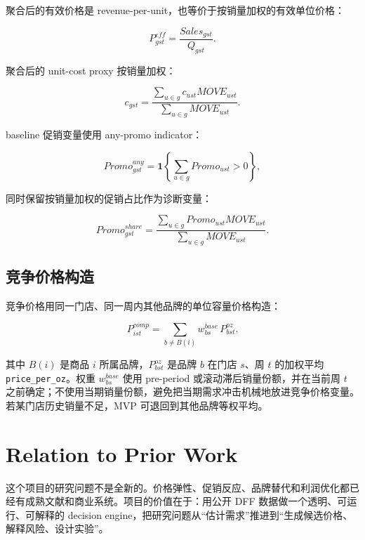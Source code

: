 \documentclass[UTF8,11pt,a4paper,fontset=none]{ctexart}
\begin{document}
聚合后的有效价格是 revenue-per-unit，也等价于按销量加权的有效单位价格：

\begin{equation}
P^{eff}_{gst}=\frac{Sales_{gst}}{Q_{gst}}.
\end{equation}

聚合后的 unit-cost proxy 按销量加权：

\begin{equation}
c_{gst}=
\frac{\sum_{u\in g} c_{ust} MOVE_{ust}}
{\sum_{u\in g} MOVE_{ust}}.
\end{equation}

baseline 促销变量使用 any-promo indicator：

\begin{equation}
Promo^{any}_{gst}=\mathbf{1}\left\{\sum_{u\in g} Promo_{ust}>0\right\},
\end{equation}

同时保留按销量加权的促销占比作为诊断变量：

\begin{equation}
Promo^{share}_{gst}
=
\frac{\sum_{u\in g} Promo_{ust}MOVE_{ust}}
{\sum_{u\in g} MOVE_{ust}}.
\end{equation}

\subsection{竞争价格构造}

竞争价格用同一门店、同一周内其他品牌的单位容量价格构造：

\begin{equation}
P^{comp}_{ist}=\sum_{b\ne B(i)} w^{base}_{bs}\,P^{oz}_{bst}.
\end{equation}

其中 $B(i)$ 是商品 $i$ 所属品牌，$P^{oz}_{bst}$ 是品牌 $b$ 在门店 $s$、周 $t$ 的加权平均 \texttt{price\_per\_oz}。权重 $w^{base}_{bs}$ 使用 pre-period 或滚动滞后销量份额，并在当前周 $t$ 之前确定；不使用当期销量份额，避免把当期需求冲击机械地放进竞争价格变量。若某门店历史销量不足，MVP 可退回到其他品牌等权平均。

\section{Relation to Prior Work}

这个项目的研究问题不是全新的。价格弹性、促销反应、品牌替代和利润优化都已经有成熟文献和商业系统。项目的价值在于：用公开 DFF 数据做一个透明、可运行、可解释的 decision engine，把研究问题从“估计需求”推进到“生成候选价格、解释风险、设计实验”。
\end{document}
